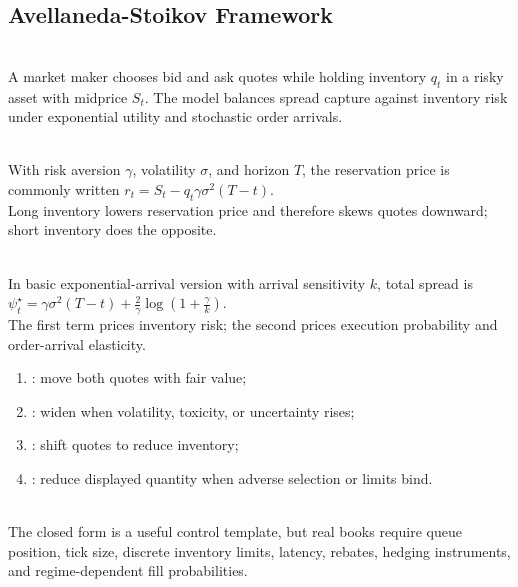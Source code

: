 \subsection{Avellaneda-Stoikov Framework}

\begin{model} \\
A market maker chooses bid and ask quotes while holding inventory $q_t$ in a risky asset with midprice $S_t$. The model balances spread capture against inventory risk under exponential utility and stochastic order arrivals.
\end{model}

\begin{model} \\
With risk aversion $\gamma$, volatility $\sigma$, and horizon $T$, the reservation price is commonly written $r_t=S_t-q_t\gamma\sigma^2(T-t)$.\\
Long inventory lowers reservation price and therefore skews quotes downward; short inventory does the opposite.
\end{model}

\begin{model} \\
In basic exponential-arrival version with arrival sensitivity $k$, total spread is $\psi_t^\star=\gamma\sigma^2(T-t)+\frac{2}{\gamma}\log\left(1+\frac{\gamma}{k}\right)$.\\
The first term prices inventory risk; the second prices execution probability and order-arrival elasticity.
\end{model}

\begin{taxonomy} 
\begin{enumerate}[label=\roman*.]
\setlength{\itemsep}{0pt}
\item {}: move both quotes with fair value;
\item {}: widen when volatility, toxicity, or uncertainty rises;
\item {}: shift quotes to reduce inventory;
\item {}: reduce displayed quantity when adverse selection or limits bind.
\end{enumerate}
\end{taxonomy}

\begin{caveat} \\
The closed form is a useful control template, but real books require queue position, tick size, discrete inventory limits, latency, rebates, hedging instruments, and regime-dependent fill probabilities.
\end{caveat}
